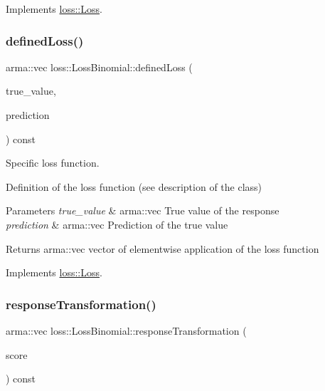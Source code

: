 Implements \hyperlink{classloss_1_1_loss_a267a4de70747ade4b2d84ce35a448979}{loss\+::\+Loss}.

\mbox{\label{classloss_1_1_loss_binomial_a396a06f762b735f83af21bdd4ba8fe9c}} 
\subsubsection{\texorpdfstring{defined\+Loss()}{definedLoss()}}
{\footnotesize\ttfamily arma\+::vec loss\+::\+Loss\+Binomial\+::defined\+Loss (\begin{DoxyParamCaption}\item[{const arma\+::vec \&}]{true\+\_\+value,  }\item[{const arma\+::vec \&}]{prediction }\end{DoxyParamCaption}) const\hspace{0.3cm}{\ttfamily [virtual]}}



Specific loss function. 

Definition of the loss function (see description of the class)


\begin{DoxyParams}{Parameters}
{\em true\+\_\+value} & {\ttfamily arma\+::vec} True value of the response \\
\hline
{\em prediction} & {\ttfamily arma\+::vec} Prediction of the true value\\
\hline
\end{DoxyParams}
\begin{DoxyReturn}{Returns}
{\ttfamily arma\+::vec} vector of elementwise application of the loss function 
\end{DoxyReturn}


Implements \hyperlink{classloss_1_1_loss_ae9f94dd9b8311397583ba3a9cb485e94}{loss\+::\+Loss}.

\mbox{\label{classloss_1_1_loss_binomial_a757fd8d478732ce94e8ba9497846bcf4}} 
\subsubsection{\texorpdfstring{response\+Transformation()}{responseTransformation()}}
{\footnotesize\ttfamily arma\+::vec loss\+::\+Loss\+Binomial\+::response\+Transformation (\begin{DoxyParamCaption}\item[{const arma\+::vec \&}]{score }\end{DoxyParamCaption}) const\hspace{0.3cm}{\ttfamily [virtual]}}



